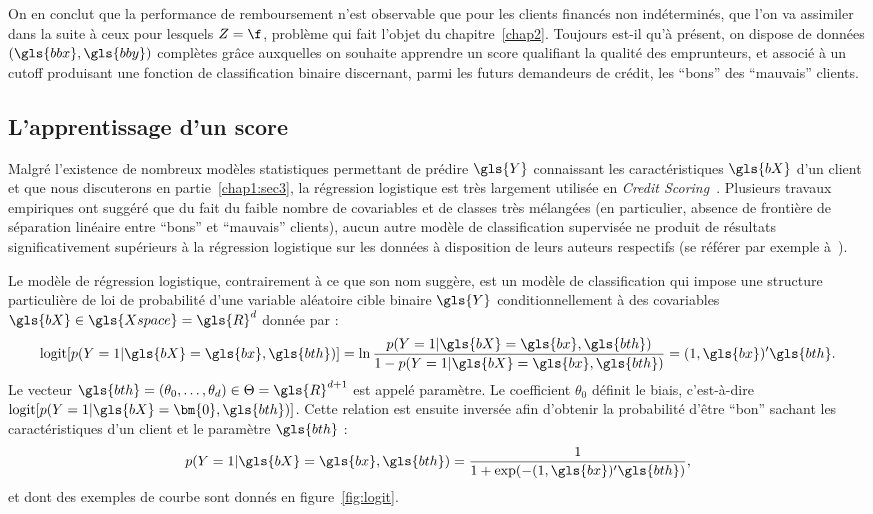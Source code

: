 On en conclut que la performance de remboursement n'est observable que pour les clients financés non indéterminés, que l'on va assimiler dans la suite à ceux pour lesquels $Z=\f$, problème qui fait l'objet du chapitre~\ref{chap2}. Toujours est-il qu'à présent, on dispose de données $(\gls{bbx},\gls{bby})$ complètes grâce auxquelles on souhaite apprendre un \gls{score} qualifiant la qualité des emprunteurs, et associé à un cutoff produisant une fonction de classification binaire discernant, parmi les futurs demandeurs de crédit, les ``bons'' des ``mauvais'' clients.

\subsection{L'apprentissage d'un \gls{score}} \label{subsec:apprentissage}

Malgré l'existence de nombreux modèles statistiques permettant de prédire $\gls{Y}$ connaissant les caractéristiques $\gls{bX}$ d'un client et que nous discuterons en partie~\ref{chap1:sec3}, la régression logistique est très largement utilisée en \textit{Credit Scoring}~\cite{thomas2000survey}. Plusieurs travaux empiriques ont suggéré que du fait du faible nombre de covariables et de classes très mélangées (en particulier, absence de frontière de séparation linéaire entre ``bons'' et ``mauvais'' clients), aucun autre modèle de classification supervisée ne produit de résultats significativement supérieurs à la régression logistique sur les données à disposition de leurs auteurs respectifs (se référer par exemple à~\cite{hand1997statistical,baesens2003benchmarking,brown2012experimental}).

Le modèle de régression logistique, contrairement à ce que son nom suggère, est un modèle de classification qui impose une structure particulière de loi de probabilité d'une variable aléatoire cible binaire $\gls{Y}$ conditionnellement à des covariables $\gls{bX} \in \gls{Xspace}=\gls{R}^d$ donnée par :
\begin{equation} \label{eq:logit}
\text{logit}[p(Y=1 | \gls{bX}=\gls{bx}, \gls{bth})] = \ln \frac{p(Y=1 | \gls{bX}=\gls{bx}, \gls{bth})}{1-p(Y=1 | \gls{bX}=\gls{bx}, \gls{bth})} = (1,\gls{bx})' \gls{bth}.
\end{equation}
Le vecteur $\gls{bth} = (\theta_0,\dots,\theta_d) \in \Theta = \gls{R}^{d+1}$ est appelé paramètre. Le coefficient $\theta_0$ définit le biais, c'est-à-dire $\text{logit}[p(Y=1 | \gls{bX}=\bm{0}, \gls{bth})]$. Cette relation est ensuite inversée afin d'obtenir la probabilité d'être ``bon'' sachant les caractéristiques d'un client et le paramètre $\gls{bth}$ : $$p(Y=1 | \gls{bX}=\gls{bx}, \gls{bth}) = \frac{1}{1+\exp(-(1,\gls{bx})' \gls{bth})},$$ et dont des exemples de courbe sont donnés en figure~\ref{fig:logit}.

